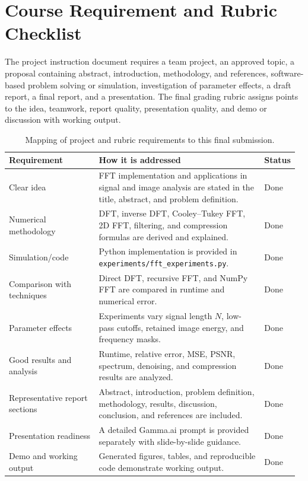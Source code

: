 \documentclass{zc-ust-hw}
\begin{document}
\section{Course Requirement and Rubric Checklist}
The project instruction document requires a team project, an approved topic, a proposal containing abstract, introduction, methodology, and references, software-based problem solving or simulation, investigation of parameter effects, a draft report, a final report, and a presentation. The final grading rubric assigns points to the idea, teamwork, report quality, presentation quality, and demo or discussion with working output.

\begin{table}[H]
\centering
\caption{Mapping of project and rubric requirements to this final submission.}
\begin{tabular}{p{0.31\linewidth}p{0.58\linewidth}p{0.08\linewidth}}
\toprule
\textbf{Requirement} & \textbf{How it is addressed} & \textbf{Status} \\
\midrule
Clear idea & FFT implementation and applications in signal and image analysis are stated in the title, abstract, and problem definition. & Done \\
Numerical methodology & DFT, inverse DFT, Cooley--Tukey FFT, 2D FFT, filtering, and compression formulas are derived and explained. & Done \\
Simulation/code & Python implementation is provided in \texttt{experiments/fft\_experiments.py}. & Done \\
Comparison with techniques & Direct DFT, recursive FFT, and NumPy FFT are compared in runtime and numerical error. & Done \\
Parameter effects & Experiments vary signal length \(N\), low-pass cutoffs, retained image energy, and frequency masks. & Done \\
Good results and analysis & Runtime, relative error, MSE, PSNR, spectrum, denoising, and compression results are analyzed. & Done \\
Representative report sections & Abstract, introduction, problem definition, methodology, results, discussion, conclusion, and references are included. & Done \\
Presentation readiness & A detailed Gamma.ai prompt is provided separately with slide-by-slide guidance. & Done \\
Demo and working output & Generated figures, tables, and reproducible code demonstrate working output. & Done \\
\bottomrule
\end{tabular}
\label{tab:checklist}
\end{table}
\end{document}
